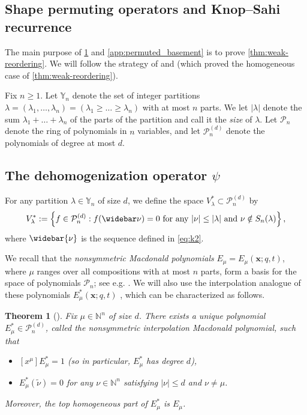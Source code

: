 \documentclass[12pt]{amsart}
\newtheorem{thm}{Theorem}[section]
\theoremstyle{definition}
\newcommand{\bfx}{\boldsymbol{x}}
\newcommand{\mcP}{\mathcal P}
\newcommand{\VV}{V_{\lambda}^*}
\newcommand{\NN}{\mathbb N}
\newcommand{\YY}{\mathbb Y}
\begin{document}
\begin{appendices}
    
\section{Shape permuting operators and Knop–Sahi recurrence}\label{app:shape_permuting}
The main purpose of \cref{app:shape_permuting} and \cref{app:permuted_basement} is to prove \cref{thm:weak-reordering}. We will follow the strategy of \cite{AlexanderssonSawhney2019} and \cite{AyyerMartinWilliams2025} (which proved the homogeneous case of \cref{thm:weak-reordering}). 

Fix $n\geq 1$. Let $\YY_n$ denote the set of integer partitions 
$\lambda=(\lambda_1,\dots,\lambda_n)=(\lambda_1 \geq \dots \geq \lambda_n)$ with at most $n$ parts.  We let $|\lambda|$ denote the sum $\lambda_1+ \dots + \lambda_n$ of the parts of the partition and call it the \emph{size} of $\lambda$.
Let $\mcP_n$ denote the ring of polynomials in $n$ variables, and 
let $\mcP_n^{(d)}$ denote the polynomials of degree at most $d$. 


\subsection{The dehomogenization operator \texorpdfstring{$\psi$}{psi}}
For any partition $\lambda\in\YY_n$ of size $d$, we define the space $\VV\subset\mcP^{(d)}_n$ by
$$\VV:=\left\{f\in \mcP_n^{(d)}: f(\widebar\nu)=0 \text{ for any $|\nu|\leq |\lambda|$ and $\nu\notin S_n(\lambda)$}\right\},$$
where $\widebar{\nu}$ is the sequence defined in \cref{eq:k2}.

We recall that the \textit{nonsymmetric Macdonald polynomials} $E_{\mu} = E_\mu(\bfx;q,t)$, where $\mu$ ranges over all compositions with at most $n$ parts, form a basis for the space of polynomials $\mcP_n$; see e.g. \cite{HaglundHaimanLoehr2008}. 
We will also use the interpolation analogue of these polynomials $E^*_\mu(\bfx;q,t)$ \cite{Knop1997b,Sahi1996}, which can be characterized as follows. 
\begin{thm}[\cite{Knop1997b,Sahi1996}]\label{thm:Knop_Sahi}
    Fix $\mu\in \NN^n$ of size $d$. There exists a unique polynomial $E^*_\mu\in\mcP_n^{(d)}$, called the \emph{nonsymmetric interpolation Macdonald polynomial}, such that
    \begin{itemize}
        \item $[x^\mu]E^*_\mu=1$ (so in particular, $E^*_{\mu}$ has degree $d$),
        \item $E^*_\mu(\widetilde\nu)=0$ for any $\nu\in \NN^n$ satisfying $|\nu|\leq d$ and $\nu\neq \mu$.
    \end{itemize}
    Moreover, the top homogeneous part of $E^*_\mu$ is 
    $E_\mu$.
\end{thm}




\end{appendices}
\end{document}
